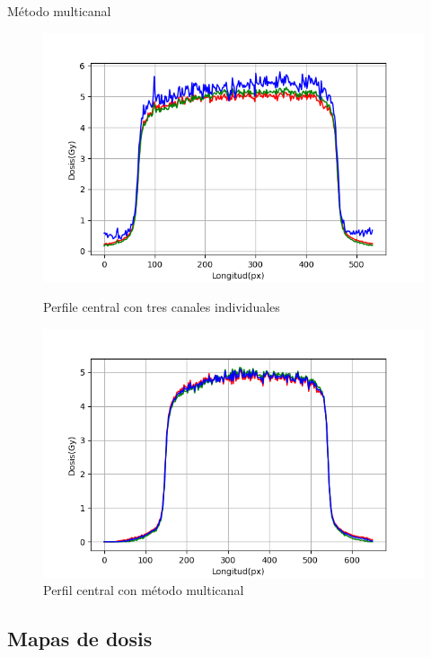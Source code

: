 \documentclass[12pt]{beamer}
\begin{document}
\begin{frame}{Método multicanal}
\begin{figure}[htp]%
	\centering
	\begin{minipage}{0.5\textwidth}
		\includegraphics[width=\textwidth]{images/perfilDosisCuadradoUnoSolo.png}
		\caption{Perfile central con tres canales individuales}
	\end{minipage}\hfill
	\begin{minipage}{0.5\textwidth}
		\includegraphics[width=\textwidth]{images/perfilDosisCuadradoMulticanal.png}
		\caption{Perfil central con método multicanal}
	\end{minipage}
	
\end{figure}
\end{frame}

\subsection{Mapas de dosis}
\end{document}

